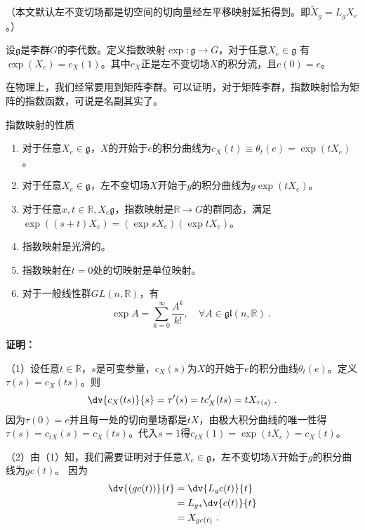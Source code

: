 

（本文默认左不变切场都是切空间的切向量经左平移映射延拓得到。即$\widetilde X_g=L_g X_e$。）
\begin{definition}{}
设$\mathfrak g$是李群$G$的李代数。定义指数映射$\exp :\mathfrak g\to G$，对于任意$X_e\in \mathfrak g$ 有$\exp (X_e)=c_X(1)$。其中$c_X$正是左不变切场$X$的积分流，且$c(0)=e$。
\end{definition}
在物理上，我们经常要用到矩阵李群。可以证明，对于矩阵李群，指数映射恰为矩阵的指数函数，可说是名副其实了。

\begin{theorem}{指数映射的性质}
\begin{enumerate}
\item 对于任意$X_e\in \mathfrak g$，$X$的开始于$e$的积分曲线为$c_X(t)\equiv\theta_t(e)=\exp (tX_e)$。
\item 对于任意$X_e\in \mathfrak g$，左不变切场$X$开始于$g$的积分曲线为$g\exp (tX_e)$。
\item 对于任意$x,t\in\mathbb R,X_e\mathfrak g$，指数映射是$\mathbb R\to G$的群同态，满足$\exp ((s+t)X_e)=(\exp sX_e)(\exp tX_e)$。

\item 指数映射是光滑的。
\item 指数映射在$t=0$处的切映射是单位映射。
\item 对于一般线性群$GL(n,\mathbb R)$，有
\begin{equation}
\exp  A=\sum_{k=0}^\infty\frac{A^k}{k!},\quad \forall A\in\mathfrak{gl}(n,\mathbb{R})~.
\end{equation}
\end{enumerate}
\end{theorem}

\textbf{证明：}

（1）设任意$t\in \mathbb R$，$s$是可变参量，$c_X(s)$为$X$的开始于$e$的积分曲线$\theta_t(e)$。定义$\tau(s)=c_X(ts)$。则
\begin{equation}
\dv{c_X(ts)}{s}=\tau'(s)=tc'_X(ts)=tX_{\tau (s)}~.
\end{equation}
因为$\tau(0)=e$并且每一处的切向量场都是$tX$，由极大积分曲线的唯一性得$\tau(s)=c_{tX}(s)=c_X(ts)$。代入$s=1$得$c_{tX}(1)=\exp(tX_e)=c_X(t)$。

（2）由（1）知，我们需要证明对于任意$X_e\in \mathfrak g$，左不变切场$X$开始于$g$的积分曲线为$gc(t)$。
因为
\begin{equation}
\begin{aligned}
\dv{(gc(t))}{t}&=\dv{L_gc(t)}{t}\\
&=L_{g*}\dv{c(t)}{t}\\
&=X_{gc(t)}~.
\end{aligned}
\end{equation}

